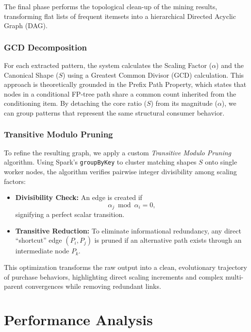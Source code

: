 \documentclass[10pt, twocolumn]{article}
\begin{document}
The final phase performs the topological clean-up of the mining results,
transforming flat lists of frequent itemsets into a hierarchical Directed
Acyclic Graph (DAG).

\subsubsection{GCD Decomposition}

For each extracted pattern, the system calculates the Scaling Factor ($\alpha$)
and the Canonical Shape ($S$) using a Greatest Common Divisor (GCD)
calculation. This approach is theoretically grounded in the Prefix Path
Property, which states that nodes in a conditional FP-tree path share a common
count inherited from the conditioning item. By detaching the core ratio ($S$)
from its magnitude ($\alpha$), we can group patterns that represent the same
structural consumer behavior.

\subsubsection{Transitive Modulo Pruning}

To refine the resulting graph, we apply a custom \textit{Transitive Modulo
    Pruning} algorithm. Using Spark’s \texttt{groupByKey} to cluster matching
shapes $S$ onto single worker nodes, the algorithm verifies pairwise integer
divisibility among scaling factors:

\begin{itemize}
    \item \textbf{Divisibility Check:} An edge is created if
          \[
              \alpha_j \bmod \alpha_i = 0,
          \]
          signifying a perfect scalar transition.

    \item \textbf{Transitive Reduction:} To eliminate informational redundancy,
          any direct ``shortcut'' edge $(P_i, P_j)$ is pruned if an alternative path
          exists through an intermediate node $P_k$.
\end{itemize}

This optimization transforms the raw output into a clean, evolutionary
trajectory of purchase behaviors, highlighting direct scaling increments and
complex multi-parent convergences while removing redundant links.

\section{Performance Analysis}
\end{document}
